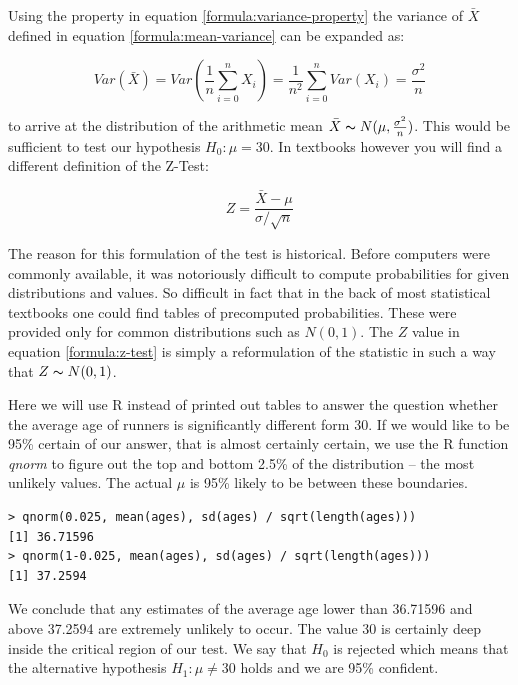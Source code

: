 \documentclass{tufte-book} %
\begin{document}
Using the property in equation \ref{formula:variance-property} the variance of $\bar{X}$ defined in equation \ref{formula:mean-variance} can be expanded as:

\begin{equation}
Var(\bar{X}) = Var(\frac{1}{n}\sum_{i=0}^n X_i) = \frac{1}{n^2}\sum_{i=0}^n Var(X_i) = \frac{\sigma^2}{n}
\end{equation}

to arrive at the distribution of the arithmetic mean $\bar{X} \thicksim N(\mu, \frac{\sigma^2}{n})$. This would be sufficient to test our hypothesis $H_0: \mu = 30$. In textbooks however you will find a different definition of the \hbox{Z-Test}:

\begin{equation}
Z = \frac{\bar{X} - \mu}{\sigma / \sqrt{n}}
\label{formula:z-test}
\end{equation}

The reason for this formulation of the test is historical. Before computers were commonly available, it was notoriously difficult to compute probabilities for given distributions and values. So difficult in fact that in the back of most statistical textbooks one could find tables of precomputed probabilities. These were provided only for common distributions such as $N(0, 1)$. The $Z$ value in equation \ref{formula:z-test} is simply a reformulation of the statistic in such a way that $Z \thicksim N(0, 1)$.

Here we will use R instead of printed out tables to answer the question whether the average age of runners is significantly different form 30. If we would like to be 95\% certain of our answer, that is almost certainly certain, we use the R function {\em qnorm} to figure out the top and bottom 2.5\% of the distribution -- the most unlikely values. The actual $\mu$ is 95\% likely to be between these boundaries.

\begin{verbatim}
> qnorm(0.025, mean(ages), sd(ages) / sqrt(length(ages)))
[1] 36.71596
> qnorm(1-0.025, mean(ages), sd(ages) / sqrt(length(ages)))
[1] 37.2594
\end{verbatim}

We conclude that any estimates of the average age lower than 36.71596 and above 37.2594 are extremely unlikely to occur. The value 30 is certainly deep inside the critical region of our test. We say that $H_0$ is rejected which means that the alternative hypothesis $H_1: \mu \neq 30$ holds and we are 95\% confident. 
\end{document}
